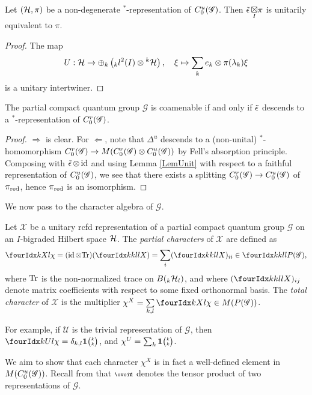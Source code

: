 \begin{Lem}\label{LemUnit} Let $(\mathcal{H},\pi)$ be a non-degenerate $^*$-representation of $C^{u}_{0}(\mathscr{G})$. Then $\operatorname{\tilde{\epsilon}}\underset{I}{\boxtimes} \pi$ is unitarily equivalent to $\pi$.
\end{Lem} 
\begin{proof} The map \[U: \mathcal{H} \rightarrow \oplus_k \left({}_kl^2(I)\otimes {}^k\mathcal{H}\right),\quad \xi \mapsto \sum_k e_k\otimes \pi(\lambda_k)\xi\] is a unitary intertwiner.
\end{proof} 

\begin{Prop} The partial compact quantum group $\mathscr{G}$ is coamenable if and only if $\operatorname{\tilde{\epsilon}}$ descends to a $^*$-representation of $C^{r}_{0}(\mathscr{G})$.
\end{Prop} 
\begin{proof} $\Rightarrow$ is clear. For $\Leftarrow$, note that $\Delta^u$ descends to a (non-unital) $^*$-homomorphism $C^{r}_{0}(\mathscr{G})\rightarrow M(C^{r}_{0}(\mathscr{G})\otimes C^{u}_{0}(\mathscr{G}))$ by Fell's absorption principle. Composing with $\operatorname{\tilde{\epsilon}}\otimes \operatorname{id}$ and using Lemma \ref{LemUnit} with respect to a faithful representation of $C^{u}_{0}(\mathscr{G})$, we see that there exists a splitting $C^{r}_{0}(\mathscr{G})\rightarrow C^{u}_{0}(\mathscr{G})$ of $\pi_{\operatorname{\mathrm{red}}}$, hence $\pi_{\operatorname{\mathrm{red}}}$ is an isomorphism.
\end{proof}
 
We now pass to the character algebra of $\mathscr{G}$.
 
 \begin{Def} Let $\mathscr{X}$ be a unitary rcfd representation of a partial compact quantum group $\mathscr{G}$ on an $I$-bigraded Hilbert space $\mathcal{H}$. The \emph{partial characters} of $\mathscr{X}$ are defined as \[\Gr{\chi}{}{X}{k}{l} = (\id\otimes \Tr)(\Gr{X}{k}{l}{k}{l}) = \sum_i(\Gr{X}{k}{l}{k}{l})_{ii} \in \Gr{P(\mathscr{G})}{k}{l}{k}{l},\] where $\mathrm{Tr}$ is the non-normalized trace on $B({}_{k}\mathcal{H}_{l})$, and where $(\Gr{X}{k}{l}{k}{l})_{ij}$ denote matrix coefficients with respect to some fixed orthonormal basis. The \emph{total character} of $\mathscr{X}$ is the multiplier $\chi^X  =\underset{k,l}{\sum} \,\Gr{\chi}{}{X}{k}{l}\in M(P(\mathscr{G}))$.
 \end{Def}
 
 For example, if $\mathscr{U}$ is the trivial representation of $\mathscr{G}$, then $\Gr{\chi}{}{U}{k}{l} = \delta_{k,l}\UnitC{k}{k}$, and $\chi^U = \sum_k \mathbf{1}{\tiny {\begin{pmatrix} k\\k\end{pmatrix}}}$.
 
 We aim to show that each character $\chi^X$ is in fact a well-defined element in $M(C^{u}_{0}(\mathscr{G}))$. Recall from \cite{DCT1} that $\smCirct$ denotes the tensor product of two representations of $\mathscr{G}$. 
 
